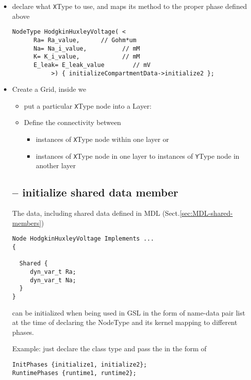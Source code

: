 \begin{itemize}
  \item declare what \verb!X!Type to use, and maps its method to the proper
  phase defined above

\begin{verbatim}
NodeType HodgkinHuxleyVoltage( <
      Ra= Ra_value,      // Gohm*um
      Na= Na_i_value,          // mM
      K= K_i_value,            // mM 
      E_leak= E_leak_value        // mV
           >) { initializeCompartmentData->initialize2 };
\end{verbatim}

  \item Create a Grid, inside we 
  
  \begin{itemize}
    \item put a particular \verb!X!Type node into a Layer:
    
    \item Define the connectivity between 
    \begin{itemize}
      \item  instances of \verb!X!Type node
    within one layer or 
      \item instances of \verb!X!Type node in one layer to 
      instances of \verb!Y!Type node in another layer
  \end{itemize}
  
\end{itemize}



\subsection{-- initialize shared data member}
\label{sec:GSL_initialize-type-shared-data-member}

The data, including shared data defined in MDL
(Sect.\ref{sec:MDL-shared-members})
\begin{verbatim}
Node HodgkinHuxleyVoltage Implements ...
{

  Shared {
     dyn_var_t Ra;
     dyn_var_t Na;
  }
}
\end{verbatim}
can be initialized when being used in GSL in the form of name-data pair list
at the time of declaring the NodeType and its kernel mapping to different
phases.

Example: just declare the class type and pass the in the form of 
\begin{verbatim}
InitPhases {initialize1, initialize2};
RuntimePhases {runtime1, runtime2};


\end{verbatim}
\end{itemize}
